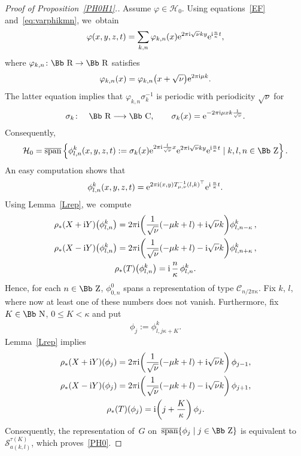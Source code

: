 \documentclass[10pt,a4paper]{amsart}
\newcommand\CC{{\mbox{\Bb C}}}
\newcommand\RR{{\mbox{\Bb R}}}
\newcommand\NN{{\mbox{\Bb N}}}
\newcommand\ZZ{{\mbox{\Bb Z}}}
\newcommand\cC{{\mathcal C}}
\newcommand\cH{{\mathcal H}}
\newcommand{\cSpan}{{\overline{\rm span}}}
\numberwithin{equation}{section}
\begin{document}
\begin{proof}[Proof of Proposition~\ref{PH0H1}.]
Assume $\varphi\in \cH_0$. Using equations~\eqref{EF} and~\eqref{eq:varphikmn}, we~obtain
\begin{gather*}
\varphi(x,y,z,t)
=\sum_{k,n}\varphi_{k,n}(x){\rm e}^{2\pi {\rm i}\sqrt\nu ky}{\rm e}^{{\rm i} \frac{n}{\kappa}t},
\end{gather*}
where $\varphi_{k,n}\colon \RR\rightarrow\RR$ satisfies
\begin{gather*}
\varphi_{k,n}(x)=\varphi_{k,n}\big(x+\sqrt\nu\big) {\rm e}^{2\pi {\rm i}\mu k}.
\end{gather*}
The latter equation implies that $\varphi_{k,n}\sigma_k^{-1}$ is periodic with periodicity $\sqrt\nu$ for
\begin{gather*}
\sigma_k\colon\quad \RR\longrightarrow\CC,\qquad
\sigma_k(x)={\rm e}^{-2\pi {\rm i}\mu xk\frac{1}{\sqrt\nu}}.
\end{gather*}
Consequently,
\begin{gather*}
\cH_0=\cSpan\left\{\phi_{l,n}^k(x,y,z,t):=\sigma_k(x){\rm e}^{2\pi {\rm i} \frac l{\sqrt\nu}x} {\rm e}^{2\pi {\rm i}\sqrt\nu ky} {\rm e}^{{\rm i} \frac n\kappa t}\mid k,l,n\in\ZZ\right\}.
\end{gather*}
An easy computation shows that
\begin{gather*}
\phi_{l,n}^k(x,y,z,t)={\rm e}^{2\pi {\rm i}(x,y)T_{\mu,\nu}^{-1}(l,k)^\top} {\rm e}^{{\rm i}\,\frac n\kappa t}.
\end{gather*}
Using Lemma~\ref{Lrep}, we~compute
\begin{gather*}
\rho_*(X+{\rm i}Y)\big(\phi_{l,n}^k\big)= {2\pi {\rm i} \bigg(\frac 1{\sqrt\nu}(-\mu k+l)+{\rm i}\sqrt \nu k \bigg) \phi_{l,n-\kappa}^k}\,,
\\
\rho_*(X-{\rm i}Y)\big(\phi_{l,n}^k\big)= {2\pi {\rm i} \bigg(\frac 1{\sqrt\nu}(-\mu k+l)-{\rm i}\sqrt \nu k \bigg) \phi_{l,n+\kappa}^k}\,,
\\
\rho_*(T)\big(\phi_{l,n}^k\big)={\rm i}\,\frac n\kappa\, \phi_{l,n}^k.
\end{gather*}
Hence, for each $n\in\ZZ$, $\phi_{0,n}^0$ spans a representation of type $\cC_{n/2\pi\kappa}$. Fix $k$, $l$, where now at least one of these numbers does not vanish. Furthermore, fix $K\in \NN$, $0\le K<\kappa$ and put
\begin{gather*}
\phi_j:=\phi^k_{l,j\kappa+K}.
\end{gather*}
Lemma~\ref{Lrep} implies
\begin{gather*}
\rho_*(X+{\rm i}Y)(\phi_j)={2\pi {\rm i} \bigg(\frac 1{\sqrt\nu}(-\mu k+l)+{\rm i}\sqrt \nu k \bigg) \, \phi_{j-1}},
\\
\rho_*(X-{\rm i}Y)(\phi_j)={2\pi {\rm i} \bigg(\frac 1{\sqrt\nu}(-\mu k+l)-{\rm i}\sqrt \nu k \bigg) \, \phi_{j+1}},
\\
\rho_*(T)(\phi_j)={\rm i}\bigg(j+\frac K\kappa\bigg)\, \phi_j.
\end{gather*}
Consequently, the representation of~$G$ on~$\cSpan\{\phi_j\mid j\in\ZZ\}$ is equivalent to~${\mathcal S}_{a(k,l)}^{\tau(K)}$,
which pro\-ves~\eqref{PH0}.


\end{proof}
\end{document}
